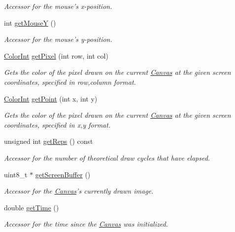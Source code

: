 \begin{DoxyCompactItemize}
\begin{DoxyCompactList}\small\item\em \-Accessor for the mouse's x-\/position. \end{DoxyCompactList}\item 
int \hyperlink{classtsgl_1_1_canvas_a7fc8592848aaa14c3ff440d0ed3c9e4f}{get\-Mouse\-Y} ()
\begin{DoxyCompactList}\small\item\em \-Accessor for the mouse's y-\/position. \end{DoxyCompactList}\item 
\hyperlink{structtsgl_1_1_color_int}{\-Color\-Int} \hyperlink{classtsgl_1_1_canvas_a1f54dba4b09d248e2611f3409353c2c6}{get\-Pixel} (int row, int col)
\begin{DoxyCompactList}\small\item\em \-Gets the color of the pixel drawn on the current \hyperlink{classtsgl_1_1_canvas}{\-Canvas} at the given screen coordinates, specified in row,column format. \end{DoxyCompactList}\item 
\hyperlink{structtsgl_1_1_color_int}{\-Color\-Int} \hyperlink{classtsgl_1_1_canvas_aa31883b3c9b09006cf82b270ad7a0a9f}{get\-Point} (int x, int y)
\begin{DoxyCompactList}\small\item\em \-Gets the color of the pixel drawn on the current \hyperlink{classtsgl_1_1_canvas}{\-Canvas} at the given screen coordinates, specified in x,y format. \end{DoxyCompactList}\item 
unsigned int \hyperlink{classtsgl_1_1_canvas_a8f0819f368b41b147f1a7f560a7af6a4}{get\-Reps} () const 
\begin{DoxyCompactList}\small\item\em \-Accessor for the number of theoretical draw cycles that have elapsed. \end{DoxyCompactList}\item 
uint8\-\_\-t $\ast$ \hyperlink{classtsgl_1_1_canvas_a71f072dd82ca3b5cecfd65cde6d8a226}{get\-Screen\-Buffer} ()
\begin{DoxyCompactList}\small\item\em \-Accessor for the \hyperlink{classtsgl_1_1_canvas}{\-Canvas}'s currently drawn image. \end{DoxyCompactList}\item 
double \hyperlink{classtsgl_1_1_canvas_aef462ab48e59571b9c88076bbdc8f0b3}{get\-Time} ()
\begin{DoxyCompactList}\small\item\em \-Accessor for the time since the \hyperlink{classtsgl_1_1_canvas}{\-Canvas} was initialized. \end{DoxyCompactList}\item 

\end{DoxyCompactItemize}

